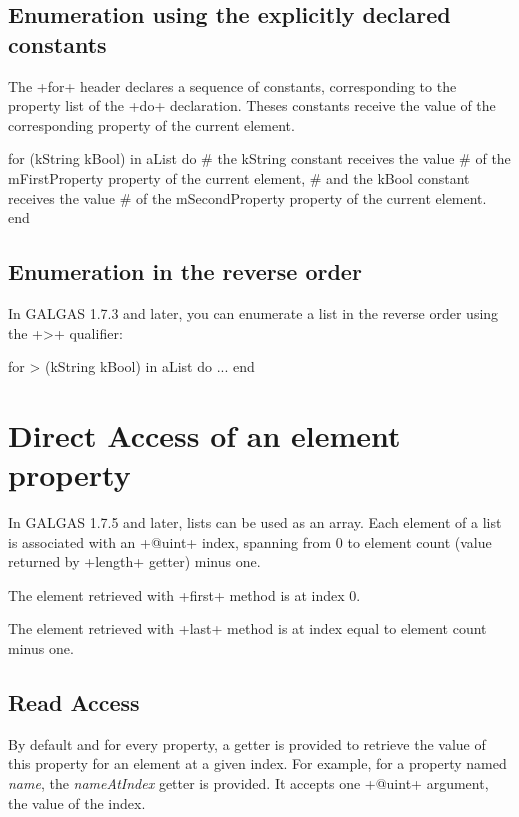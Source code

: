 \subsection{Enumeration using the explicitly declared constants}

The \ggs+for+ header declares a sequence of constants, corresponding to the property list of the \ggs+do+ declaration. Theses constants receive the value of the corresponding property of the current element.


\begin{galgas}
for (kString kBool) in aList do
  # the kString constant receives the value
  # of the mFirstProperty property of the current element,
  # and the kBool constant receives the value
  # of the mSecondProperty property of the current element.
end
\end{galgas}

\subsection{Enumeration in the reverse order}

In GALGAS 1.7.3 and later, you can enumerate a list in the reverse order using the \ggs+>+ qualifier:

\begin{galgas}
for > (kString kBool) in aList do
  ...
end
\end{galgas}




\section{Direct Access of an element property}

In GALGAS 1.7.5 and later, lists can be used as an array. Each element of a list is associated with an \ggs+@uint+ index, spanning from 0 to element count (value returned by \ggs+length+ getter) minus one.

The element retrieved with \ggs+first+ method is at index 0.

The element retrieved with \ggs+last+ method is at index equal to element count minus one.

\subsection{Read Access}

By default and for every property, a getter is provided to retrieve the value of this property for an element at a given index. For example, for a property named \emph{name}, the \emph{nameAtIndex} getter is provided. It accepts one \ggs+@uint+ argument, the value of the index.

